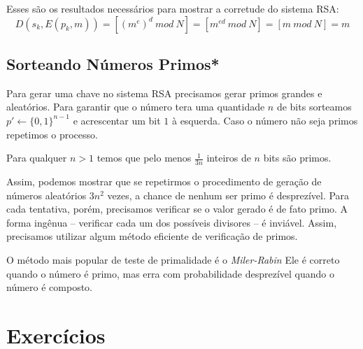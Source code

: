 Esses são os resultados necessários para mostrar a corretude do sistema RSA:
\begin{displaymath}
D(s_k, E(p_k, m)) = [(m^e)^d\ mod\ N] = [m^{ed}\ mod\ N] = [m\ mod\ N] = m  
\end{displaymath}


\subsection{Sorteando Números Primos*}
\label{sec:primos}

Para gerar uma chave no sistema RSA precisamos gerar primos grandes e aleatórios.
Para garantir que o número tera uma quantidade $n$ de bits sorteamos $p' \leftarrow \{0,1\}^{n-1}$ e acrescentar um bit $1$ à esquerda.
Caso o número não seja primos repetimos o processo.

\begin{theorem}[Bertrand]
  Para qualquer $n > 1$ temos que pelo menos $\frac{1}{3n}$ inteiros de $n$ bits são primos.
\end{theorem}

Assim, podemos mostrar que se repetirmos o procedimento de geração de números aleatórios $3n^2$ vezes, a chance de nenhum ser primo é desprezível.
Para cada tentativa, porém, precisamos verificar se o valor gerado é de fato primo.
A forma ingênua -- verificar cada um dos possíveis divisores -- é inviável.
Assim, precisamos utilizar algum método eficiente de verificação de primos.

O método mais popular de teste de primalidade é o {\em Miler-Rabin}
Ele é correto quando o número é primo, mas erra com probabilidade desprezível quando o número é composto.


\section{Exercícios}
\label{sec:exercicios}


